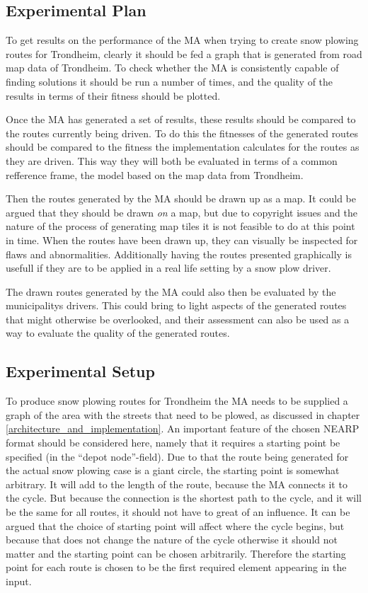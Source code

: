 \subsection{Experimental Plan}

To get results on the performance of the MA when trying to create snow plowing routes for Trondheim, clearly it should be fed a graph that is generated from road map data of Trondheim. To check whether the MA is consistently capable of finding solutions it should be run a number of times, and the quality of the results in terms of their fitness should be plotted.

Once the MA has generated a set of results, these results should be compared to the routes currently being driven. To do this the fitnesses of the generated routes should be compared to the fitness the implementation calculates for the routes as they are driven. This way they will both be evaluated in terms of a common refference frame, the model based on the map data from Trondheim.

Then the routes generated by the MA should be drawn up as a map. It could be argued that they should be drawn \emph{on} a map, but due to copyright issues and the nature of the process of generating map tiles it is not feasible to do at this point in time. When the routes have been drawn up, they can visually be inspected for flaws and abnormalities. Additionally having the routes presented graphically is usefull if they are to be applied in a real life setting by a snow plow driver.

The drawn routes generated by the MA could also then be evaluated by the municipalitys drivers. This could bring to light aspects of the generated routes that might otherwise be overlooked, and their assessment can also be used as a way to evaluate the quality of the generated routes.

\subsection{Experimental Setup}

To produce snow plowing routes for Trondheim the MA needs to be supplied a graph of the area with the streets that need to be plowed, as discussed in chapter \ref{architecture_and_implementation}. An important feature of the chosen NEARP format should be considered here, namely that it requires a starting point be specified (in the \enquote{depot node}-field). Due to that the route being generated for the actual snow plowing case is a giant circle, the starting point is somewhat arbitrary. It will add to the length of the route, because the MA connects it to the cycle. But because the connection is the shortest path to the cycle, and it will be the same for all routes, it should not have to great of an influence. It can be argued that the choice of starting point will affect where the cycle begins, but because that does not change the nature of the cycle otherwise it should not matter and the starting point can be chosen arbitrarily. Therefore the starting point for each route is chosen to be the first required element appearing in the input.

